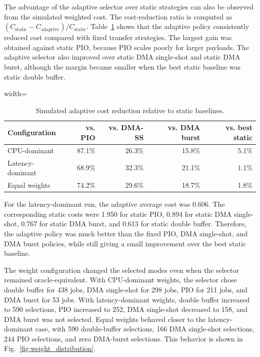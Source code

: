 \documentclass[conference]{IEEEtran}
\begin{document}
The advantage of the adaptive selector over static strategies can also be observed from the simulated weighted cost. The cost-reduction ratio is computed as $(C_{\text{static}}-C_{\text{adaptive}})/C_{\text{static}}$. Table~\ref{tab:sim_cost_reduction} shows that the adaptive policy consistently reduced cost compared with fixed transfer strategies. The largest gain was obtained against static PIO, because PIO scales poorly for larger payloads. The adaptive selector also improved over static DMA single-shot and static DMA burst, although the margin became smaller when the best static baseline was static double buffer.

\begin{table}[ht!]
\centering
\caption{Simulated adaptive cost reduction relative to static baselines.}
\label{tab:sim_cost_reduction}
\scriptsize
\begin{adjustbox}{width=\columnwidth}
\begin{tabular}{lrrrr}
\toprule
\textbf{Configuration} & \textbf{vs. PIO} & \textbf{vs. DMA-SS} & \textbf{vs. DMA burst} & \textbf{vs. best static} \\
\midrule
CPU-dominant & 87.1\% & 26.3\% & 15.8\% & 5.1\% \\
Latency-dominant & 68.9\% & 32.3\% & 21.1\% & 1.1\% \\
Equal weights & 74.2\% & 29.6\% & 18.7\% & 1.8\% \\
\bottomrule
\end{tabular}
\end{adjustbox}
\end{table}

For the latency-dominant run, the adaptive average cost was 0.606. The corresponding static costs were 1.950 for static PIO, 0.894 for static DMA single-shot, 0.767 for static DMA burst, and 0.613 for static double buffer. Therefore, the adaptive policy was much better than the fixed PIO, DMA single-shot, and DMA burst policies, while still giving a small improvement over the best static baseline.

The weight configuration changed the selected modes even when the selector remained oracle-equivalent. With CPU-dominant weights, the selector chose double buffer for 438 jobs, DMA single-shot for 298 jobs, PIO for 211 jobs, and DMA burst for 53 jobs. With latency-dominant weights, double buffer increased to 590 selections, PIO increased to 252, DMA single-shot decreased to 158, and DMA burst was not selected. Equal weights behaved closer to the latency-dominant case, with 590 double-buffer selections, 166 DMA single-shot selections, 244 PIO selections, and zero DMA-burst selections. This behavior is shown in Fig.~\ref{fig:weight_distribution}.
\end{document}
